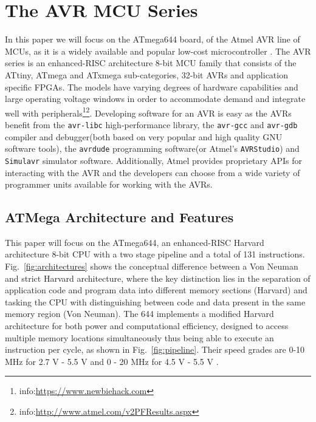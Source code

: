 \section{The AVR MCU Series}
\label{sec:atmega_overview}

	In this paper we will focus on the ATmega644 board, of the Atmel AVR line of MCUs, as it is a widely available and popular low-cost microcontroller \citep{glitches_paper} . The AVR series is an enhanced-RISC architecture 8-bit MCU family that consists of the ATtiny, ATmega and ATxmega sub-categories,  32-bit AVRs and application specific FPGAs\cite{book:practical_avr}. The models have varying degrees of hardware capabilities and large operating voltage windows in order to accommodate demand and integrate well with peripherals\footnote{info:\href{https://www.newbiehack.com/MicrocontrollersAlternativePowerSources.aspx}{https://www.newbiehack.com}}\footnote{info:\href{http://www.atmel.com/v2PFResults.aspx}{http://www.atmel.com/v2PFResults.aspx}}. Developing software for an AVR is easy as the AVRs benefit from the  \texttt{avr-libc} high-performance library, the \texttt{avr-gcc} and \texttt{avr-gdb} compiler and debugger(both based on very popular and high quality GNU software tools), the \texttt{avrdude} programming software(or Atmel's \texttt{AVRStudio}) and \texttt{Simulavr} simulator software. Additionally, Atmel provides proprietary APIs for interacting with the AVR and the developers can choose from a wide variety of programmer units available for working with the AVRs\cite{book:practical_avr}.
	
	\subsection{ATMega Architecture and Features}				

	This paper will focus on the ATmega644, an enhanced-RISC Harvard architecture 8-bit CPU with a two stage pipeline and a total of 131 instructions. Fig.~\ref{fig:architectures} shows the conceptual difference between a Von Neuman and strict Harvard architecture, where the key distinction lies in the separation of application code and program data into different memory sections (Harvard) and tasking the CPU with distinguishing between code and data present in the same memory region (Von Neuman). The 644 implements a modified Harvard architecture for both power and computational efficiency, designed to access multiple memory locations simultaneously thus being able to execute an instruction per cycle, as shown in Fig.~\ref{fig:pipeline}. Their speed grades are  0-10 MHz for 2.7 V - 5.5 V and 0 - 20 MHz for 4.5 V - 5.5 V \citep{atmega_manual}.


